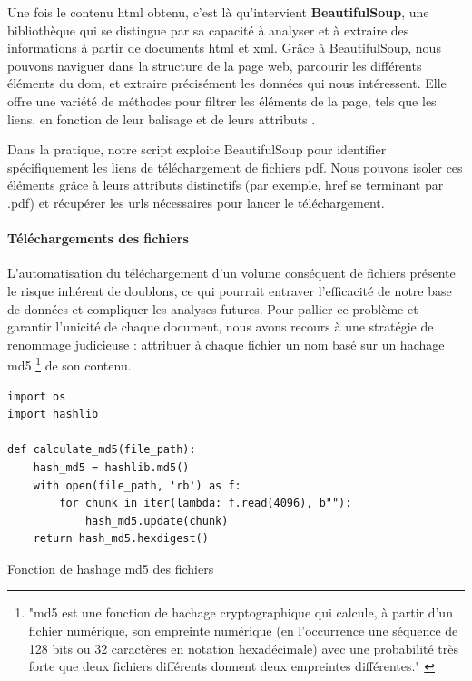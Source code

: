 Une fois le contenu \ac{html} obtenu, c'est là qu'intervient \textbf{BeautifulSoup}, une bibliothèque qui se distingue par sa capacité à analyser et à extraire des informations à partir de documents \ac{html} et \ac{xml}. Grâce à BeautifulSoup, nous pouvons naviguer dans la structure de la page web, parcourir les différents éléments du \ac{dom}, et extraire précisément les données qui nous intéressent. Elle offre une variété de méthodes pour filtrer les éléments de la page, tels que les liens, en fonction de leur balisage et de leurs attributs \cite{frwiki:203869267}.

Dans la pratique, notre script exploite BeautifulSoup pour identifier spécifiquement les liens de téléchargement de fichiers \ac{pdf}. Nous pouvons isoler ces éléments grâce à leurs attributs distinctifs (par exemple, href se terminant par .pdf) et récupérer les \acs{url}s nécessaires pour lancer le téléchargement.

\paragraph{Téléchargements des fichiers} \hspace{0pt}

L'automatisation du téléchargement d'un volume conséquent de fichiers présente le risque inhérent de doublons, ce qui pourrait entraver l'efficacité de notre base de données et compliquer les analyses futures. Pour pallier ce problème et garantir l'unicité de chaque document, nous avons recours à une stratégie de renommage judicieuse : attribuer à chaque fichier un nom basé sur un hachage \ac{md5} \footnote{"\ac{md5} est une fonction de hachage cryptographique qui calcule, à partir d'un fichier numérique, son empreinte numérique (en l'occurrence une séquence de 128 bits ou 32 caractères en notation hexadécimale) avec une probabilité très forte que deux fichiers différents donnent deux empreintes différentes." \cite{frwiki:203545836}} de son contenu.

\begin{listing}[!ht]
\begin{verbatim}
import os
import hashlib

def calculate_md5(file_path):
    hash_md5 = hashlib.md5()
    with open(file_path, 'rb') as f:
        for chunk in iter(lambda: f.read(4096), b""):
            hash_md5.update(chunk)
    return hash_md5.hexdigest()
\end{verbatim}
\caption{Fonction de hashage \ac{md5} des fichiers}
\label{appendix:code:python:md5-hashing}
\end{listing}

